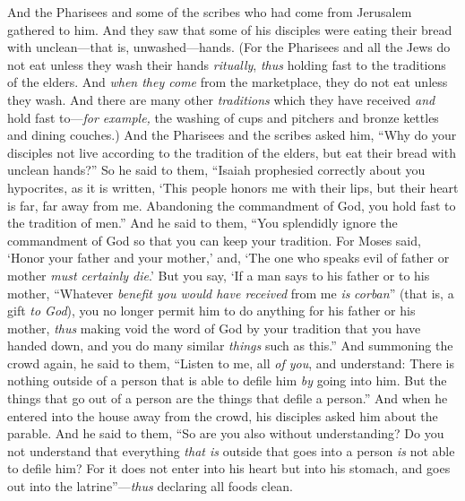 \begin{biblechapter} %
 And the Pharisees and some of the scribes who had come from Jerusalem gathered to him.
\verse And they saw that some of his disciples were eating their bread with unclean—that is, unwashed—hands.
\verse (For the Pharisees and all the Jews do not eat unless they wash their hands \textit{ritually}, \textit{thus} holding fast to the traditions of the elders.
\verse And \textit{when they come} from the marketplace, they do not eat unless they wash. And there are many other \textit{traditions} which they have received \textit{and} hold fast to—\textit{for example,} the washing of cups and pitchers and bronze kettles and dining couches.)
\verse And the Pharisees and the scribes asked him, “Why do your disciples not live according to the tradition of the elders, but eat their bread with unclean hands?”
\verse So he said to them, “Isaiah prophesied correctly about you hypocrites, as it is written,
\verse ‘This people honors me with their lips, 
but their heart is far, far away from me.
\verse Abandoning the commandment of God, you hold fast to the tradition of men.”
\verse And he said to them, “You splendidly ignore the commandment of God so that you can keep your tradition.
\verse For Moses said, ‘Honor your father and your mother,’ and, ‘The one who speaks evil of father or mother \textit{must certainly die}.’
\verse But you say, ‘If a man says to his father or to his mother, “Whatever \textit{benefit you would have received} from me \textit{is} \textit{corban}” (that is, a gift \textit{to God}),
\verse you no longer permit him to do anything for his father or his mother,
\verse \textit{thus} making void the word of God by your tradition that you have handed down, and you do many similar \textit{things} such as this.”
 And summoning the crowd again, he said to them, “Listen to me, all \textit{of you}, and understand:
\verse There is nothing outside of a person that is able to defile him \textit{by} going into him. But the things that go out of a person are the things that defile a person.”
\verse And when he entered into the house away from the crowd, his disciples asked him about the parable.
\verse And he said to them, “So are you also without understanding? Do you not understand that everything \textit{that is} outside that goes into a person \textit{is} not able to defile him?
\verse For it does not enter into his heart but into his stomach, and goes out into the latrine”—\textit{thus} declaring all foods clean.

\end{biblechapter}
